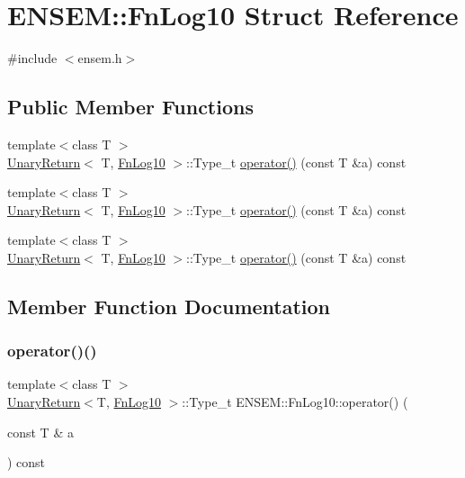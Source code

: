 \hypertarget{structENSEM_1_1FnLog10}{}\section{E\+N\+S\+EM\+:\+:Fn\+Log10 Struct Reference}
\label{structENSEM_1_1FnLog10}


{\ttfamily \#include $<$ensem.\+h$>$}

\subsection*{Public Member Functions}
\begin{DoxyCompactItemize}
\item 
{\footnotesize template$<$class T $>$ }\\\mbox{\hyperlink{structENSEM_1_1UnaryReturn}{Unary\+Return}}$<$ T, \mbox{\hyperlink{structENSEM_1_1FnLog10}{Fn\+Log10}} $>$\+::Type\+\_\+t \mbox{\hyperlink{structENSEM_1_1FnLog10_a391be0578edd7ffb0348e9dd601e8323}{operator()}} (const T \&a) const
\item 
{\footnotesize template$<$class T $>$ }\\\mbox{\hyperlink{structENSEM_1_1UnaryReturn}{Unary\+Return}}$<$ T, \mbox{\hyperlink{structENSEM_1_1FnLog10}{Fn\+Log10}} $>$\+::Type\+\_\+t \mbox{\hyperlink{structENSEM_1_1FnLog10_a391be0578edd7ffb0348e9dd601e8323}{operator()}} (const T \&a) const
\item 
{\footnotesize template$<$class T $>$ }\\\mbox{\hyperlink{structENSEM_1_1UnaryReturn}{Unary\+Return}}$<$ T, \mbox{\hyperlink{structENSEM_1_1FnLog10}{Fn\+Log10}} $>$\+::Type\+\_\+t \mbox{\hyperlink{structENSEM_1_1FnLog10_a391be0578edd7ffb0348e9dd601e8323}{operator()}} (const T \&a) const
\end{DoxyCompactItemize}


\subsection{Member Function Documentation}
\mbox{\label{structENSEM_1_1FnLog10_a391be0578edd7ffb0348e9dd601e8323}} 
\subsubsection{\texorpdfstring{operator()()}{operator()()}\hspace{0.1cm}{\footnotesize\ttfamily [1/3]}}
{\footnotesize\ttfamily template$<$class T $>$ \\
\mbox{\hyperlink{structENSEM_1_1UnaryReturn}{Unary\+Return}}$<$T, \mbox{\hyperlink{structENSEM_1_1FnLog10}{Fn\+Log10}} $>$\+::Type\+\_\+t E\+N\+S\+E\+M\+::\+Fn\+Log10\+::operator() (\begin{DoxyParamCaption}\item[{const T \&}]{a }\end{DoxyParamCaption}) const\hspace{0.3cm}{\ttfamily [inline]}}

